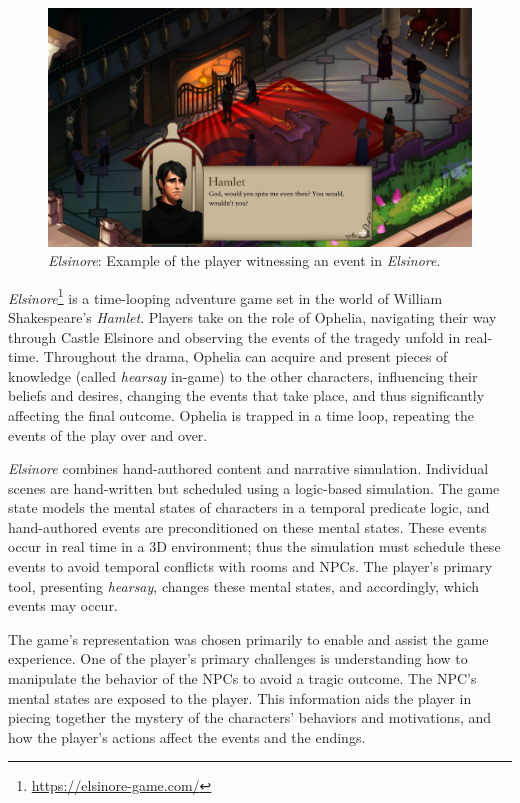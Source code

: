 \documentclass[letterpaper]{article}
\begin{document}
\begin{figure}[tbh]
  \centering
  \includegraphics[width=\columnwidth]{images/elsinore-screen}
  \caption{\textit{Elsinore}: Example of the player witnessing an event in \textit{Elsinore}.}
  \label{fig:el-setting}
\end{figure}


\textit{Elsinore}\footnote{\url{https://elsinore-game.com/}} is a time-looping adventure game set in the world of William Shakespeare's \textit{Hamlet}.
Players take on the role of Ophelia, navigating their way through Castle Elsinore and observing the events of the tragedy unfold in real-time.
Throughout the drama, Ophelia can acquire and present pieces of knowledge (called \textit{hearsay} in-game) to the other characters, influencing their beliefs and desires, changing the events that take place, and thus significantly affecting the final outcome.
Ophelia is trapped in a time loop, repeating the events of the play over and over.

\textit{Elsinore} combines hand-authored content and narrative simulation.
Individual scenes are hand-written but scheduled using a logic-based simulation.
The game state models the mental states of characters in a temporal predicate logic, and hand-authored events are preconditioned on these mental states.
These events occur in real time in a 3D environment; thus the simulation must schedule these events to avoid temporal conflicts with rooms and NPCs.
The player's primary tool, presenting \textit{hearsay}, changes these mental states, and accordingly, which events may occur.

The game's representation was chosen primarily to enable and assist the game experience.
One of the player's primary challenges is understanding how to manipulate the behavior of the NPCs to avoid a tragic outcome.
The NPC's mental states are exposed to the player.
This information aids the player in piecing together the mystery of the characters' behaviors and motivations, and how the player's actions affect the events and the endings.
\end{document}
